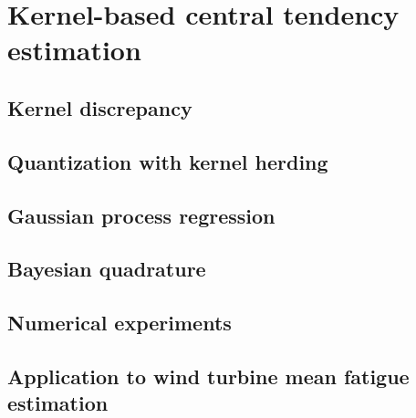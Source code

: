 \chapter{Kernel-based central tendency estimation}
    \section{Kernel discrepancy}
    \section{Quantization with kernel herding }
    \section{Gaussian process regression}
    \section{Bayesian quadrature }
    \section{Numerical experiments }
    \section{Application to wind turbine mean fatigue estimation }

